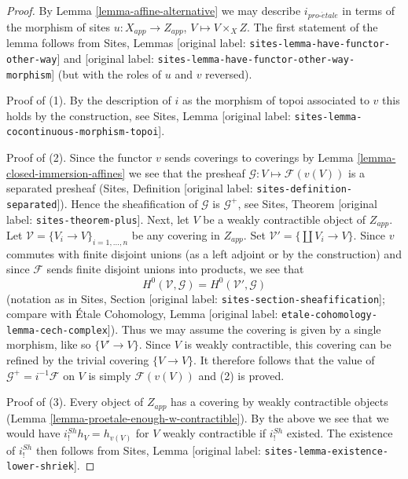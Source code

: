 \documentclass[10pt,a4paper]{article}
\theoremstyle{plain}
\theoremstyle{definition}
\theoremstyle{remark}
\numberwithin{equation}{subsection}
\def\proetale{{pro\text{-}\acute{e}tale}}
\begin{document}
\begin{proof}
By Lemma \ref{lemma-affine-alternative} we may describe $i_\proetale$ in terms
of the morphism of sites $u : X_{app} \to Z_{app}$, $V \mapsto V \times_X Z$.
The first statement of the lemma follows from
Sites, Lemmas \textnormal{[original label: \nolinkurl{sites-lemma-have-functor-other-way}]} and
\textnormal{[original label: \nolinkurl{sites-lemma-have-functor-other-way-morphism}]}
(but with the roles of $u$ and $v$ reversed).

\medskip\noindent
Proof of (1). By the description of $i$ as the morphism of topoi associated
to $v$ this holds by the construction, see
Sites, Lemma \textnormal{[original label: \nolinkurl{sites-lemma-cocontinuous-morphism-topoi}]}.

\medskip\noindent
Proof of (2). Since the functor $v$ sends coverings to coverings by
Lemma \ref{lemma-closed-immersion-affines} we see that the presheaf
$\mathcal{G} : V \mapsto \mathcal{F}(v(V))$ is a separated presheaf
(Sites, Definition \textnormal{[original label: \nolinkurl{sites-definition-separated}]}). Hence
the sheafification of $\mathcal{G}$ is $\mathcal{G}^+$, see
Sites, Theorem \textnormal{[original label: \nolinkurl{sites-theorem-plus}]}. Next, let $V$ be a weakly
contractible object of $Z_{app}$. Let
$\mathcal{V} = \{V_i \to V\}_{i = 1, \ldots, n}$
be any covering in $Z_{app}$. Set $\mathcal{V}' = \{\coprod V_i \to V\}$.
Since $v$ commutes with finite disjoint unions (as a left adjoint or by
the construction) and since $\mathcal{F}$ sends finite disjoint
unions into products, we see that
$$
H^0(\mathcal{V}, \mathcal{G}) = H^0(\mathcal{V}', \mathcal{G})
$$
(notation as in Sites, Section \textnormal{[original label: \nolinkurl{sites-section-sheafification}]};
compare with
\'Etale Cohomology, Lemma \textnormal{[original label: \nolinkurl{etale-cohomology-lemma-cech-complex}]}).
Thus we may assume the covering is given by a single morphism, like
so $\{V' \to V\}$. Since $V$ is weakly contractible, this covering
can be refined by the trivial covering $\{V \to V\}$.
It therefore follows that the value of $\mathcal{G}^+ = i^{-1}\mathcal{F}$
on $V$ is simply $\mathcal{F}(v(V))$ and (2) is proved.

\medskip\noindent
Proof of (3). Every object of $Z_{app}$ has a covering by weakly
contractible objects (Lemma \ref{lemma-proetale-enough-w-contractible}).
By the above we see that we would have $i^{Sh}_!h_V = h_{v(V)}$ for $V$
weakly contractible if $i^{Sh}_!$ existed. The existence of
$i^{Sh}_!$ then follows from
Sites, Lemma \textnormal{[original label: \nolinkurl{sites-lemma-existence-lower-shriek}]}.


\end{proof}
\end{document}

